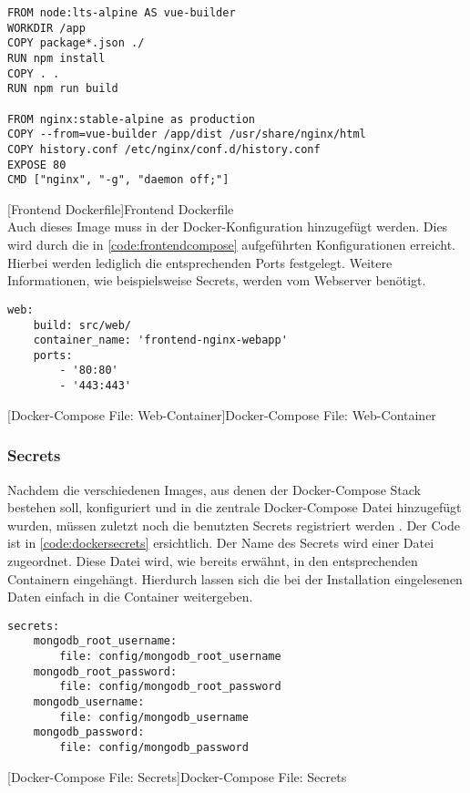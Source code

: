 \begin{verbatim}
FROM node:lts-alpine AS vue-builder
WORKDIR /app
COPY package*.json ./
RUN npm install
COPY . .
RUN npm run build
	
FROM nginx:stable-alpine as production
COPY --from=vue-builder /app/dist /usr/share/nginx/html
COPY history.conf /etc/nginx/conf.d/history.conf
EXPOSE 80
CMD ["nginx", "-g", "daemon off;"]
\end{verbatim}
[Frontend Dockerfile]{Frontend Dockerfile}
\label{code:dockerfrontend}
~\\
Auch dieses Image muss in der Docker-Konfiguration hinzugefügt werden. Dies wird durch die in \autoref{code:frontendcompose} aufgeführten Konfigurationen erreicht. Hierbei werden lediglich die entsprechenden Ports festgelegt. Weitere Informationen, wie beispielsweise Secrets, werden vom Webserver benötigt.

\begin{verbatim}
web:
	build: src/web/
	container_name: 'frontend-nginx-webapp'
	ports:
		- '80:80'
		- '443:443'
\end{verbatim}
[Docker-Compose File: Web-Container]{Docker-Compose File: Web-Container}
\label{code:frontendcompose}

\newpage

\subsubsection{Secrets}

Nachdem die verschiedenen Images, aus denen der Docker-Compose Stack bestehen soll, konfiguriert und in die zentrale Docker-Compose Datei hinzugefügt wurden, müssen zuletzt noch die benutzten Secrets registriert werden \cite{secretmongo}. Der Code ist in \autoref{code:dockersecrets} ersichtlich. Der Name des Secrets wird einer Datei zugeordnet. Diese Datei wird, wie bereits erwähnt, in den entsprechenden Containern eingehängt. Hierdurch lassen sich die bei der Installation eingelesenen Daten einfach in die Container weitergeben.

\begin{verbatim}
secrets:
	mongodb_root_username:
		file: config/mongodb_root_username
	mongodb_root_password:
		file: config/mongodb_root_password
	mongodb_username:
		file: config/mongodb_username
	mongodb_password:
		file: config/mongodb_password
\end{verbatim}
[Docker-Compose File: Secrets]{Docker-Compose File: Secrets}
\label{code:dockersecrets}

